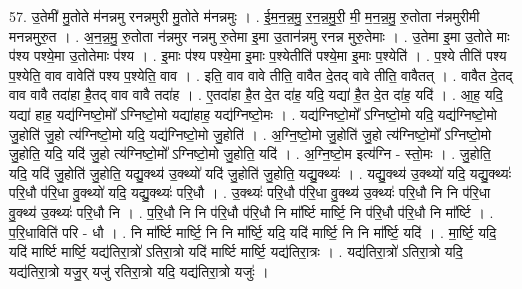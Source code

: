\documentclass[17pt]{extarticle}
\begin{document}
57. उ॒तेमी॑ मु॒तोते म॑नन्नमु रनन्नमुरी मु॒तोते म॑नन्नमुः । . ई॒म॒न॒न्न॒मु॒ र॒न॒न्न॒मु॒री॒ मी॒ म॒न॒न्न॒मु॒ रु॒तोता न॑न्नमुरीमी मनन्नमुरु॒त । . अ॒न॒न्न॒मु॒ रु॒तोता न॑न्नमुर नन्नमु रु॒तेमा इ॒मा उ॒तान॑न्नमु रनन्न मुरु॒तेमाः । . उ॒तेमा इ॒मा उ॒तोते माः प॑श्य पश्ये॒मा उ॒तोतेमाः प॑श्य । . इ॒माः प॑श्य पश्ये॒मा इ॒माः प॒श्येतीति॑ पश्ये॒मा इ॒माः प॒श्येति॑ । . प॒श्ये तीति॑ पश्य प॒श्येति॒ वाव वावेति॑ पश्य प॒श्येति॒ वाव । . इति॒ वाव वावे तीति॒ वावैत दे॒तद् वावे तीति॒ वावैतत् । . वावैत दे॒तद् वाव वावै तदा॑हा है॒तद् वाव वावै तदा॑ह । . ए॒तदा॑हा है॒त दे॒त दा॑ह॒ यदि॒ यद्या॑ है॒त दे॒त दा॑ह॒ यदि॑ । . आ॒ह॒ यदि॒ यद्या॑ हाह॒ यद्य॑ग्निष्टो॒मो᳚ ऽग्निष्टो॒मो यद्या॑हाह॒ यद्य॑ग्निष्टो॒मः । . यद्य॑ग्निष्टो॒मो᳚ ऽग्निष्टो॒मो यदि॒ यद्य॑ग्निष्टो॒मो जु॒होति॑ जु॒हो त्य॑ग्निष्टो॒मो यदि॒ यद्य॑ग्निष्टो॒मो जु॒होति॑ । . अ॒ग्नि॒ष्टो॒मो जु॒होति॑ जु॒हो त्य॑ग्निष्टो॒मो᳚ ऽग्निष्टो॒मो जु॒होति॒ यदि॒ यदि॑ जु॒हो त्य॑ग्निष्टो॒मो᳚ ऽग्निष्टो॒मो जु॒होति॒ यदि॑ । . अ॒ग्नि॒ष्टो॒म इत्य॑ग्नि - स्तो॒मः । . जु॒होति॒ यदि॒ यदि॑ जु॒होति॑ जु॒होति॒ यद्यु॒क्थ्य॑ उ॒क्थ्यो॑ यदि॑ जु॒होति॑ जु॒होति॒ यद्यु॒क्थ्यः॑ । . यद्यु॒क्थ्य॑ उ॒क्थ्यो॑ यदि॒ यद्यु॒क्थ्यः॑ परि॒धौ प॑रि॒धा वु॒क्थ्यो॑ यदि॒ यद्यु॒क्थ्यः॑ परि॒धौ । . उ॒क्थ्यः॑ परि॒धौ प॑रि॒धा वु॒क्थ्य॑ उ॒क्थ्यः॑ परि॒धौ नि नि प॑रि॒धा वु॒क्थ्य॑ उ॒क्थ्यः॑ परि॒धौ नि । . प॒रि॒धौ नि नि प॑रि॒धौ प॑रि॒धौ नि मा᳚र्ष्टि मार्ष्टि॒ नि प॑रि॒धौ प॑रि॒धौ नि मा᳚र्ष्टि । . प॒रि॒धाविति॑ परि - धौ । . नि मा᳚र्ष्टि मार्ष्टि॒ नि नि मा᳚र्ष्टि॒ यदि॒ यदि॑ मार्ष्टि॒ नि नि मा᳚र्ष्टि॒ यदि॑ । . मा॒र्ष्टि॒ यदि॒ यदि॑ मार्ष्टि मार्ष्टि॒ यद्य॑तिरा॒त्रो॑ ऽतिरा॒त्रो यदि॑ मार्ष्टि मार्ष्टि॒ यद्य॑तिरा॒त्रः । . यद्य॑तिरा॒त्रो॑ ऽतिरा॒त्रो यदि॒ यद्य॑तिरा॒त्रो यजु॒र् यजु॑ रतिरा॒त्रो यदि॒ यद्य॑तिरा॒त्रो यजुः॑ । \newline
\end{document}
